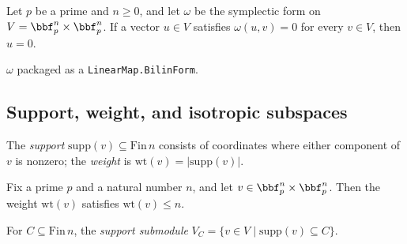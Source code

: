 \begin{lemma}
\label{sym_form_nondegenerate}
\leanok
{}
Let $p$ be a prime and $n \ge 0$, and let $\omega$ be the symplectic form on $V =
\bbf_p^n \times \bbf_p^n$. If a vector $u \in V$ satisfies $\omega(u,v) = 0$ for every
$v \in V$, then $u = 0$.
\end{lemma}

\begin{definition}
\label{symB}
\leanok
{}
$\omega$ packaged as a \texttt{LinearMap.BilinForm}.
\end{definition}

\subsection{Support, weight, and isotropic subspaces}

\begin{definition}
\label{supp}
\label{wt}
\leanok
{}
The \emph{support} $\mathrm{supp}(v) \subseteq \mathrm{Fin}\,n$ consists of
coordinates where either component of $v$ is nonzero;
the \emph{weight} is $\mathrm{wt}(v) = |\mathrm{supp}(v)|$.
\end{definition}

\begin{lemma}
\label{wt_le_n}
\leanok
{}
Fix a prime $p$ and a natural number $n$, and let $v \in \bbf_p^n \times \bbf_p^n$. Then
the weight $\mathrm{wt}(v)$ satisfies $\mathrm{wt}(v) \le n$.
\end{lemma}

\begin{definition}
\label{V_sub}
\leanok
{}
For $C \subseteq \mathrm{Fin}\,n$, the \emph{support submodule}
$V_C = \{v \in V \mid \mathrm{supp}(v) \subseteq C\}$.
\end{definition}

